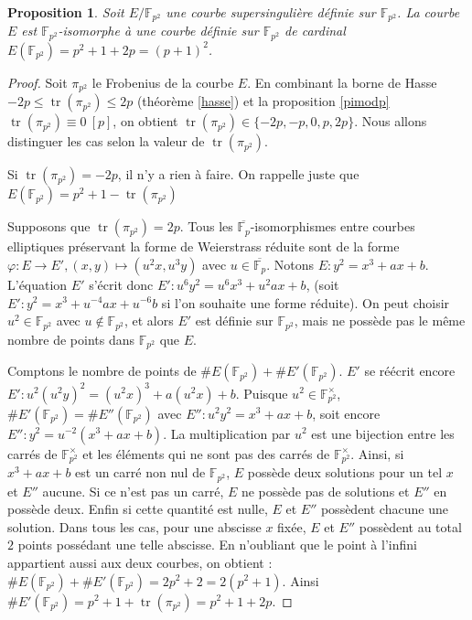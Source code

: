 \documentclass{article}
\theoremstyle{plain}%
\newtheorem{prop}[thm]{Proposition}
\theoremstyle{definition}%
\newcommand{\F}{\mathbb{F}}
\DeclareMathOperator{\tr}{tr}
\begin{document}
\begin{prop}
\label{cardsuper} 
Soit $E/\F_{p^2}$ une courbe supersingulière définie sur $\F_{p^2}$. La courbe $E$ est $\F_{p^2}$-isomorphe à une courbe définie sur $\F_{p^2}$ de cardinal $E(\F_{p^2}) = p^2 + 1 + 2p = (p+1)^2$.
\end{prop}

\begin{proof}
  Soit $\pi_{p^2}$ le Frobenius de la courbe $E$. En combinant la borne de Hasse $-2p \le \tr(\pi_{p^2}) \le 2p$ (théorème \ref{hasse}) et la proposition \ref{pimodp} $\tr(\pi_{p^2}) \equiv 0\ [p]$, on obtient $\tr(\pi_{p^2}) \in \{-2p, -p, 0, p, 2p\}$.  Nous allons distinguer les cas selon la valeur de $\tr(\pi_{p^2})$.
   
  \vspace{1em}
  Si $\tr(\pi_{p^2}) = -2p$, il n'y a rien à faire. On rappelle juste que $E(\F_{p^2}) = p^2 + 1 - \tr(\pi_{p^2})$ 
    
  \vspace{1em}
  Supposons que $\tr(\pi_{p^2}) = 2p$. Tous les $\overline{\F_p}$-isomorphismes entre courbes elliptiques préservant la forme de Weierstrass réduite sont de la forme 
      $\varphi : E \to E', (x, y) \mapsto (u^2 x, u^3 y)$ avec $u\in\overline{\F_p}$. Notons $E : y^2 = x^3 + ax +b$. L'équation $E'$ s'écrit donc $E' : u^6 y^2 = u^6 x^3 + u^2 a x + b$, (soit $E' : y^2 = x^3 + u^{-4} a x + u^{-6}b$ si l'on souhaite une forme réduite). On peut choisir $u^2\in\F_{p^2}$ avec $u\notin \F_{p^2}$, et alors $E'$ est définie sur $\F_{p^2}$, mais ne possède pas le même nombre de points dans $\F_{p^2}$ que $E$.

Comptons le nombre de points de $\#E(\F_{p^2}) + \#E'(\F_{p^2})$. $E'$ se réécrit encore $E' : u^2 (u^2 y)^2 = (u^2 x)^3 + a (u^2 x) + b$. Puisque $u^2\in \F_{p^2}^\times$, $\#E'(\F_{p^2}) = \#E''(\F_{p^2})$ avec $E'' : u^2 y^2 = x^3 + a x + b$, soit encore $E'' : y^2 = u^{-2} (x^3 + ax + b)$.
      La multiplication par $u^2$ est une bijection entre les carrés de $\F_{p^2}^\times$ et les éléments qui ne sont pas des carrés de $\F_{p^2}^\times$. 
      Ainsi, si $x^3 + ax + b$ est un carré non nul de $\F_{p^2}$, $E$ possède deux solutions pour un tel $x$ et $E''$ aucune. Si ce n'est pas un carré, $E$ ne possède pas de solutions et $E''$ en possède deux. Enfin si cette quantité est nulle, $E$ et $E''$ possèdent chacune une solution. 
Dans tous les cas, pour une abscisse $x$ fixée, $E$ et $E''$ possèdent au total $2$ points possédant une telle abscisse.
En n'oubliant que le point à l'infini appartient aussi aux deux courbes, on obtient :
      $ \#E(\F_{p^2}) + \#E'(\F_{p^2}) = 2p^2  + 2 = 2(p^2 + 1)$. Ainsi $\#E'(\F_{p^2}) = p^2 + 1 + \tr(\pi_{p^2}) = p^2 + 1 + 2p$. 
     

\end{proof}
\end{document}
